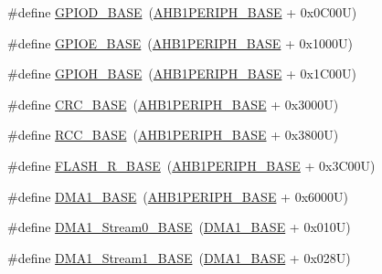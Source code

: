 \begin{DoxyCompactItemize}
\item 
\#define \hyperlink{group___peripheral__registers__structures_ga1a93ab27129f04064089616910c296ec}{G\+P\+I\+O\+D\+\_\+\+B\+A\+SE}~(\hyperlink{group___peripheral__memory__map_ga811a9a4ca17f0a50354a9169541d56c4}{A\+H\+B1\+P\+E\+R\+I\+P\+H\+\_\+\+B\+A\+SE} + 0x0\+C00\+U)
\item 
\#define \hyperlink{group___peripheral__registers__structures_gab487b1983d936c4fee3e9e88b95aad9d}{G\+P\+I\+O\+E\+\_\+\+B\+A\+SE}~(\hyperlink{group___peripheral__memory__map_ga811a9a4ca17f0a50354a9169541d56c4}{A\+H\+B1\+P\+E\+R\+I\+P\+H\+\_\+\+B\+A\+SE} + 0x1000\+U)
\item 
\#define \hyperlink{group___peripheral__registers__structures_gaee4716389f3a1c727495375b76645608}{G\+P\+I\+O\+H\+\_\+\+B\+A\+SE}~(\hyperlink{group___peripheral__memory__map_ga811a9a4ca17f0a50354a9169541d56c4}{A\+H\+B1\+P\+E\+R\+I\+P\+H\+\_\+\+B\+A\+SE} + 0x1\+C00\+U)
\item 
\#define \hyperlink{group___peripheral__registers__structures_ga656a447589e785594cbf2f45c835ad7e}{C\+R\+C\+\_\+\+B\+A\+SE}~(\hyperlink{group___peripheral__memory__map_ga811a9a4ca17f0a50354a9169541d56c4}{A\+H\+B1\+P\+E\+R\+I\+P\+H\+\_\+\+B\+A\+SE} + 0x3000\+U)
\item 
\#define \hyperlink{group___peripheral__registers__structures_ga0e681b03f364532055d88f63fec0d99d}{R\+C\+C\+\_\+\+B\+A\+SE}~(\hyperlink{group___peripheral__memory__map_ga811a9a4ca17f0a50354a9169541d56c4}{A\+H\+B1\+P\+E\+R\+I\+P\+H\+\_\+\+B\+A\+SE} + 0x3800\+U)
\item 
\#define \hyperlink{group___peripheral__registers__structures_ga8e21f4845015730c5731763169ec0e9b}{F\+L\+A\+S\+H\+\_\+\+R\+\_\+\+B\+A\+SE}~(\hyperlink{group___peripheral__memory__map_ga811a9a4ca17f0a50354a9169541d56c4}{A\+H\+B1\+P\+E\+R\+I\+P\+H\+\_\+\+B\+A\+SE} + 0x3\+C00\+U)
\item 
\#define \hyperlink{group___peripheral__registers__structures_gab2d8a917a0e4ea99a22ac6ebf279bc72}{D\+M\+A1\+\_\+\+B\+A\+SE}~(\hyperlink{group___peripheral__memory__map_ga811a9a4ca17f0a50354a9169541d56c4}{A\+H\+B1\+P\+E\+R\+I\+P\+H\+\_\+\+B\+A\+SE} + 0x6000\+U)
\item 
\#define \hyperlink{group___peripheral__registers__structures_ga0d3c52aa35dcc68f78b704dfde57ba95}{D\+M\+A1\+\_\+\+Stream0\+\_\+\+B\+A\+SE}~(\hyperlink{group___peripheral__memory__map_gab2d8a917a0e4ea99a22ac6ebf279bc72}{D\+M\+A1\+\_\+\+B\+A\+SE} + 0x010\+U)
\item 
\#define \hyperlink{group___peripheral__registers__structures_ga5b4152cef577e37eccc9311d8bdbf3c2}{D\+M\+A1\+\_\+\+Stream1\+\_\+\+B\+A\+SE}~(\hyperlink{group___peripheral__memory__map_gab2d8a917a0e4ea99a22ac6ebf279bc72}{D\+M\+A1\+\_\+\+B\+A\+SE} + 0x028\+U)

\end{DoxyCompactItemize}
